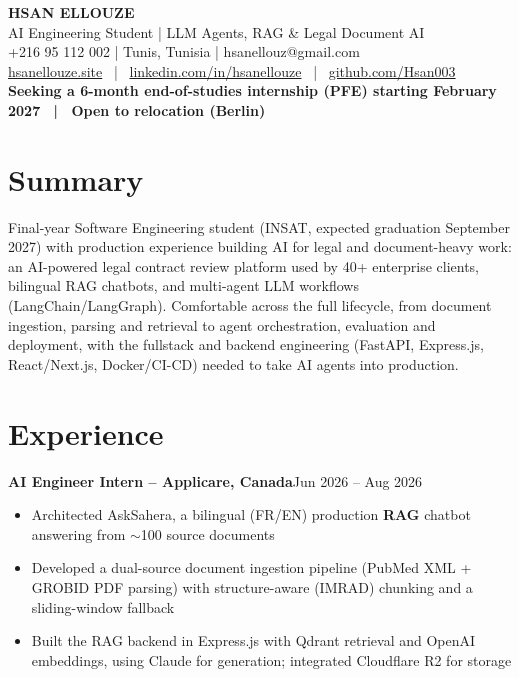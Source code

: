 \documentclass[10pt,a4paper]{article}
\newcommand{\entry}[2]{\vspace{1pt}\noindent\textbf{#1}\hfill{\color{muted}#2}\par}
\begin{document}
\begin{center}
  {\LARGE\bfseries HSAN ELLOUZE}\\[2pt]
  {\color{muted} AI Engineering Student | LLM Agents, RAG \& Legal Document AI}\\[2pt]
  {\footnotesize +216 95 112 002 | Tunis, Tunisia | hsanellouz@gmail.com}\\[1pt]
  {\footnotesize \href{https://hsanellouze.site}{hsanellouze.site} \ | \ \href{https://linkedin.com/in/hsanellouze}{linkedin.com/in/hsanellouze} \ | \ \href{https://github.com/Hsan003}{github.com/Hsan003}}\\[3pt]
  {\footnotesize\bfseries Seeking a 6-month end-of-studies internship (PFE) starting February 2027 \ | \ Open to relocation (Berlin)}
\end{center}

\section{Summary}
Final-year Software Engineering student (INSAT, expected graduation September 2027) with production experience building AI for legal and document-heavy work: an AI-powered legal contract review platform used by 40+ enterprise clients, bilingual RAG chatbots, and multi-agent LLM workflows (LangChain/LangGraph). Comfortable across the full lifecycle, from document ingestion, parsing and retrieval to agent orchestration, evaluation and deployment, with the fullstack and backend engineering (FastAPI, Express.js, React/Next.js, Docker/CI-CD) needed to take AI agents into production.

\section{Experience}
\entry{AI Engineer Intern -- Applicare, Canada}{Jun 2026 -- Aug 2026}
\begin{itemize}
  \item Architected AskSahera, a bilingual (FR/EN) production \textbf{RAG} chatbot answering from $\sim$100 source documents
  \item Developed a dual-source document ingestion pipeline (PubMed XML + GROBID PDF parsing) with structure-aware (IMRAD) chunking and a sliding-window fallback
  \item Built the RAG backend in Express.js with Qdrant retrieval and OpenAI embeddings, using Claude for generation; integrated Cloudflare R2 for storage
\end{itemize}
\end{document}
